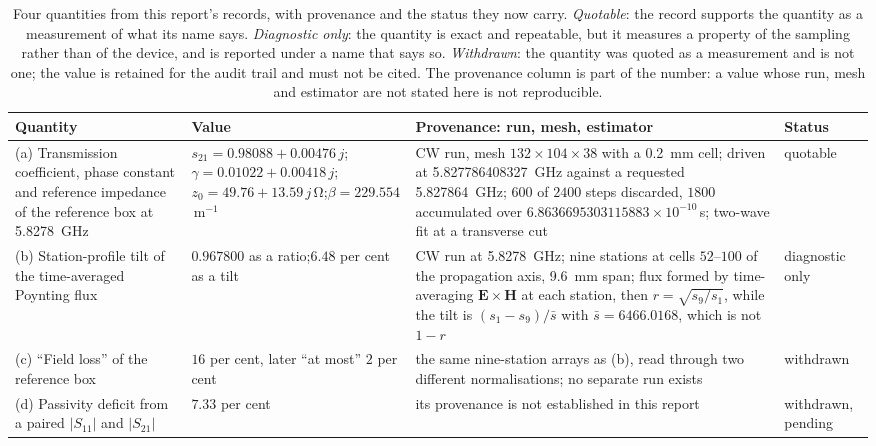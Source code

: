 \begin{table}[H]
  \centering
  \caption{Four quantities from this report's records, with provenance and the status they now carry.
  \emph{Quotable}: the record supports the quantity as a measurement of what its name says. \emph{Diagnostic
  only}: the quantity is exact and repeatable, but it measures a property of the sampling rather than of the
  device, and is reported under a name that says so. \emph{Withdrawn}: the quantity was quoted as a measurement
  and is not one; the value is retained for the audit trail and must not be cited. The provenance column is
  part of the number: a value whose run, mesh and estimator are not stated here is not reproducible.}
  \label{tab:worked}
  \small
  \begin{tabular}{@{}p{3.1cm}p{3.2cm}p{6.2cm}p{2.0cm}@{}}
    \toprule
    Quantity & Value & Provenance: run, mesh, estimator & Status \\
    \midrule
    (a) Transmission coefficient, phase constant and reference impedance of the reference box at
    \SI{5.8278}{\giga\hertz}
    & $s_{21} = 0.98088 + 0.00476\,j$;\newline $\gamma = 0.01022 + 0.00418\,j$;\newline
      $z_0 = 49.76 + 13.59\,j$\,\si{\ohm};\newline $\beta = 229.554$\,m$^{-1}$
    & CW run, mesh $132\times104\times38$ with a \SI{0.2}{mm} cell; driven at \SI{5.827786408327}{\giga\hertz}
      against a requested \SI{5.827864}{\giga\hertz}; $600$ of $2400$ steps discarded, $1800$ accumulated over
      $6.8636695303115883\times10^{-10}$\,s; two-wave fit at a transverse cut
    & quotable \\
    \addlinespace
    (b) Station-profile tilt of the time-averaged Poynting flux
    & $0.967800$ as a ratio;\newline $6.48$ per cent as a tilt
    & CW run at \SI{5.8278}{\giga\hertz}; nine stations at cells $52$--$100$ of the propagation axis, \SI{9.6}{mm}
      span; flux formed by time-averaging $\mathbf{E}\times\mathbf{H}$ at each station, then
      $r = \sqrt{s_9/s_1}$, while the tilt is $(s_1-s_9)/\bar{s}$ with $\bar{s} = 6466.0168$, which is not $1-r$
    & diagnostic only \\
    \addlinespace
    (c) ``Field loss'' of the reference box
    & $16$ per cent, later ``at most'' $2$ per cent
    & the same nine-station arrays as (b), read through two different normalisations; no separate run exists
    & withdrawn \\
    \addlinespace
    (d) Passivity deficit from a paired $|S_{11}|$ and $|S_{21}|$
    & $7.33$ per cent
    & its provenance is not established in this report
    & withdrawn, pending \\
    \bottomrule
  \end{tabular}
\end{table}

